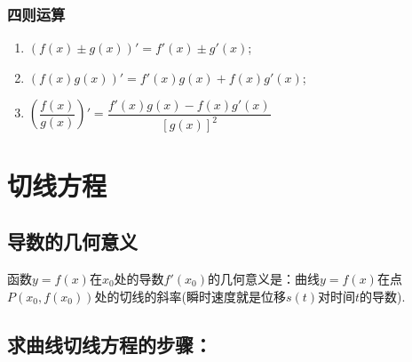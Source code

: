     \subsubsection{四则运算}
      \begin{enumerate}[1)]
        \item $ \left(f(x)\pm g(x)\right)'=f'(x)\pm g'(x) $;
        \item $\left(f(x)g(x)\right)'=f'(x)g(x)+f(x)g'(x)$;
        \item $\left(\dfrac{f(x)}{g(x)}\right)'=\dfrac{f'(x)g(x)-f(x)g'(x)}{\left[g(x)\right]^2}$
      \end{enumerate}
\section{切线方程}
  \subsection{导数的几何意义}
    {\kaishu 函数$y=f(x)$在$x_0$处的导数$ f'(x_0) $的几何意义是：曲线$y=f(x)$在点$ P(x_0,f(x_0)) $处的切线的斜率(瞬时速度就是位移$ s(t) $对时间$ t $的导数).}\par
  \subsection{求曲线切线方程的步骤：}
